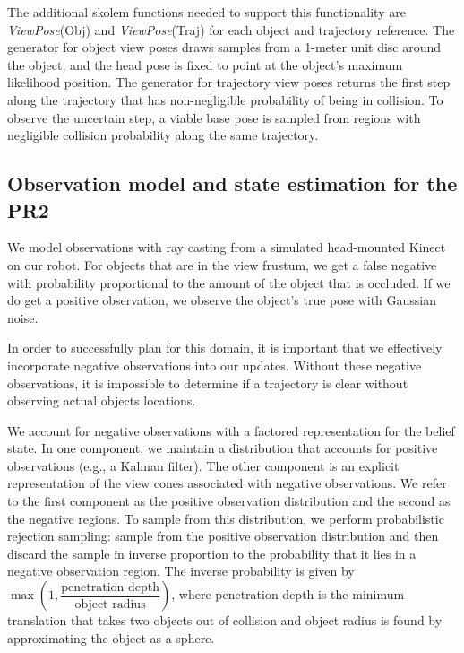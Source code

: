 The additional skolem functions needed to support this functionality
are \emph{ViewPose}(Obj) and \emph{ViewPose}(Traj) for each object and
trajectory reference. The generator for object view poses draws
samples from a 1-meter unit disc around the object, and the head pose
is fixed to point at the object's maximum likelihood position. The
generator for trajectory view poses returns the first step along the
trajectory that has non-negligible probability of being in
collision. To observe the uncertain step, a viable base pose is
sampled from regions with negligible collision probability along the
same trajectory.

\subsection{Observation model and state estimation for the PR2}
We model observations with ray casting from a simulated head-mounted
Kinect on our robot. For objects that are in the view
frustum, we get a false negative with probability proportional to the
amount of the object that is occluded. If we do get a positive
observation, we observe the object's true pose with Gaussian noise.


In order to successfully plan for this domain, it is important that we
effectively incorporate negative observations into our
updates. Without these negative observations, it is impossible to determine
if a trajectory is clear without observing actual objects
locations. 

We account for negative observations with a factored representation
for the belief state. In one component, we maintain a distribution
that accounts for positive observations (e.g., a Kalman filter). The
other component is an explicit representation of the view cones
associated with negative observations. We refer to the first component
as the positive observation distribution and the second as the
negative regions. To sample from this distribution, we perform
probabilistic rejection sampling: sample from the positive observation
distribution and then discard the sample in inverse proportion to the
probability that it lies in a negative observation region. The inverse
probability is given by $\max(1,\dfrac{\text{penetration
    depth}}{\text{object radius}})$, where penetration depth is the
minimum translation that takes two objects out of collision and object
radius is found by approximating the object as a sphere.


